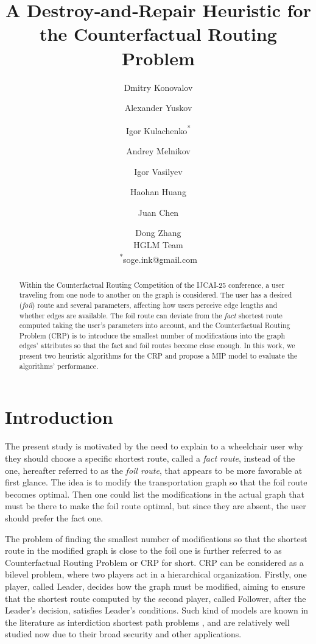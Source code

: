 \documentclass{article}
\title{A Destroy‑and‑Repair Heuristic for the Counterfactual Routing Problem}
\author{
  Dmitry Konovalov \and
  Alexander Yuskov \and
  Igor Kulachenko\textsuperscript{*} \and
  Andrey Melnikov \and
  Igor Vasilyev \and
  Haohan Huang \and
  Juan Chen \and
  Dong Zhang\\
  \affiliations
  HGLM Team \\
  \emails
  \textsuperscript{*}soge.ink@gmail.com
}
\begin{document}
\maketitle

\begin{abstract}
Within the Counterfactual Routing Competition of the IJCAI-25 conference, a user traveling from one node to another on the graph is considered. 
The user has a desired (\textit{foil}) route and several parameters, affecting how users perceive edge lengths and whether edges are available.
The foil route can deviate from the \textit{fact} shortest route computed taking the user's parameters into account, and the Counterfactual Routing Problem (CRP) is to introduce the smallest number of modifications into the graph edges' attributes so that the fact and foil routes become close enough.
In this work, we present two heuristic algorithms for the CRP and propose a MIP model to evaluate the algorithms' performance.
\end{abstract}

\section{Introduction}

The present study is motivated by the need to explain to a wheelchair user why they should choose a specific shortest route, called a \textit{fact route}, instead of the one, hereafter referred to as the \textit{foil route}, that appears to be more favorable at first glance. 
The idea is to modify the transportation graph so that the foil route becomes optimal.
Then one could list the modifications in the actual graph that must be there to make the foil route optimal, but since they are absent, the user should prefer the fact one.

The problem of finding the smallest number of modifications so that the shortest route in the modified graph is close to the foil one is further referred to as Counterfactual Routing Problem or CRP for short. 
CRP can be considered as a bilevel problem, where two players act in a hierarchical organization.
Firstly, one player, called Leader, decides how the graph must be modified, aiming to ensure that the shortest route computed by the second player, called Follower, after the Leader's decision, satisfies Leader's conditions.
Such kind of models are known in the literature as interdiction shortest path problems \cite{Israeli2002}, and are relatively well studied now due to their broad security and other applications.
\end{document}
